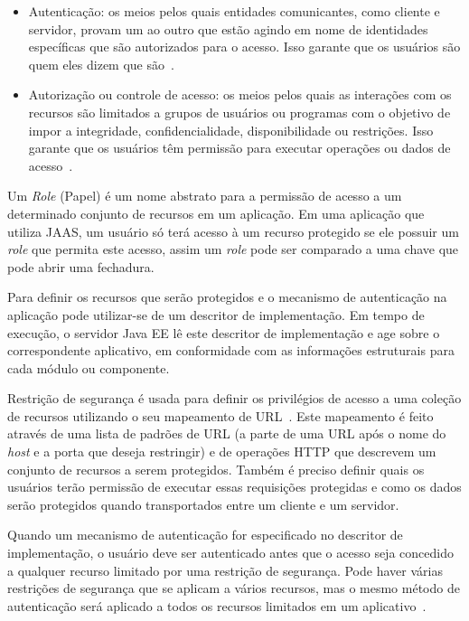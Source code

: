 \begin{itemize}
	\item Autenticação: os meios pelos quais entidades comunicantes, como cliente e servidor, provam um ao outro que estão agindo em nome de identidades específicas que são autorizados para o acesso. Isso garante que os usuários são quem eles dizem que são~\cite{oracleJAAS}.
	
	\item Autorização ou controle de acesso: os meios pelos quais as interações com os recursos são limitados a grupos de usuários ou programas com o objetivo de impor a integridade, confidencialidade, disponibilidade ou restrições. Isso garante que os usuários têm permissão para executar operações ou dados de acesso~\cite{oracleJAAS}.
\end{itemize}

Um \textit{Role} (Papel) é um nome abstrato para a permissão de acesso a um determinado conjunto de recursos em um aplicação. Em uma aplicação que utiliza JAAS, um usuário só terá acesso à um recurso protegido se ele possuir um \textit{role} que permita este acesso, assim um \textit{role} pode ser comparado a uma chave que pode abrir uma fechadura. 

Para definir os recursos que serão protegidos e o mecanismo de autenticação na aplicação pode utilizar-se de um descritor de implementação. Em tempo de execução, o servidor Java EE lê este descritor de implementação e age sobre o correspondente aplicativo, em conformidade com as informações estruturais para cada módulo ou componente.

Restrição de segurança é usada para definir os privilégios de acesso a uma coleção de recursos utilizando o seu mapeamento de URL~\cite{oracleJAAS}. Este mapeamento é feito através de uma lista de padrões de URL (a parte de uma URL após o nome do \textit{host} e a porta que deseja restringir) e de operações HTTP que descrevem um conjunto de recursos a serem protegidos. Também é preciso definir quais os usuários terão permissão de executar essas requisições protegidas e como os dados serão protegidos quando transportados entre um cliente e um servidor.

Quando um mecanismo de autenticação for especificado no descritor de implementação, o usuário deve ser autenticado antes que o acesso seja concedido a qualquer recurso limitado por uma restrição de segurança. Pode haver várias restrições de segurança que se aplicam a vários recursos, mas o mesmo método de autenticação será aplicado a todos os recursos limitados em um aplicativo~\cite{oracleJAAS}.

